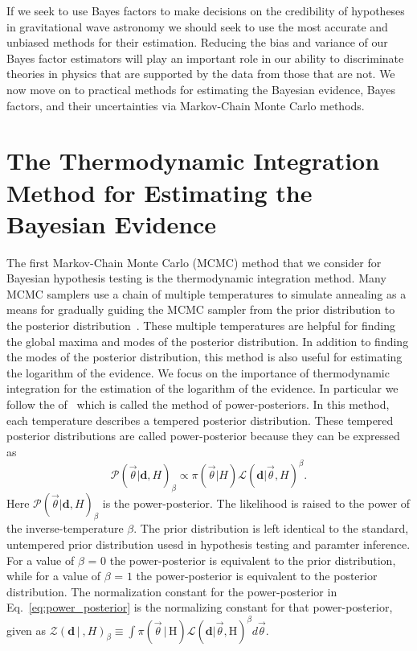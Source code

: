 If we seek to use Bayes factors to make decisions on the credibility of hypotheses in gravitational wave astronomy we should seek to use the most accurate and unbiased methods for their estimation. Reducing the bias and variance of our Bayes factor estimators will play an important role in our ability to discriminate theories in physics that are supported by the data from those that are not. We now move on to practical methods for estimating the Bayesian evidence, Bayes factors, and their uncertainties via Markov-Chain Monte Carlo methods.

\section{The Thermodynamic Integration Method for Estimating the Bayesian Evidence}\label{sec:ti}
The first Markov-Chain Monte Carlo (MCMC) method that we consider for Bayesian hypothesis testing is the thermodynamic integration method. Many MCMC samplers use a chain of multiple temperatures to simulate annealing as a means for gradually guiding the MCMC sampler from the prior distribution to the posterior distribution~\citep{emcee, vousden:2016, doi:10.1143/PTPS.157.317, B509983H}. These multiple temperatures are helpful for finding the global maxima and modes of the posterior distribution. In addition to finding the modes of the posterior distribution, this method is also useful for estimating the logarithm of the evidence. We focus on the importance of thermodynamic integration for the estimation of the logarithm of the evidence. In particular we follow the of~\cite{lartillot2006computing, friel2008marginal} which is called the method of power-posteriors. In this method, each temperature describes a tempered posterior distribution. These tempered posterior distributions are called power-posterior because they can be expressed as
\begin{equation}
    \mathcal{P}\left(\vec{\theta}|\mathbf{d}, H\right)_\beta \propto \pi\left(\vec{\theta} | H\right) \mathcal{L}\left(\mathbf{d} | \vec{\theta}, H\right)^\beta.
\end{equation}\label{eq:power_posterior}
Here $\mathcal{P}\left(\vec{\theta}|\mathbf{d}, H\right)_\beta$ is the power-posterior. The likelihood is raised to the power of the inverse-temperature $\beta$. The prior distribution is left identical to the standard, untempered prior distribution usesd in hypothesis testing and paramter inference. For a value of $\beta$ = $0$ the power-posterior is equivalent to the prior distribution, while for a value of $\beta$ = $1$ the power-posterior is equivalent to the posterior distribution. The normalization constant for the power-posterior in Eq.~\ref{eq:power_posterior} is the normalizing constant for that power-posterior, given as $\mathcal{Z}(\mathbf{d} \, | \ ,H)_\beta \equiv \int \pi\left(\vec{\theta} \, | \, \mathrm{H}\right) \mathcal{L}\left(\mathbf{d} | \vec{\theta}, \mathrm{H}\right)^\beta d\vec{\theta}$.

